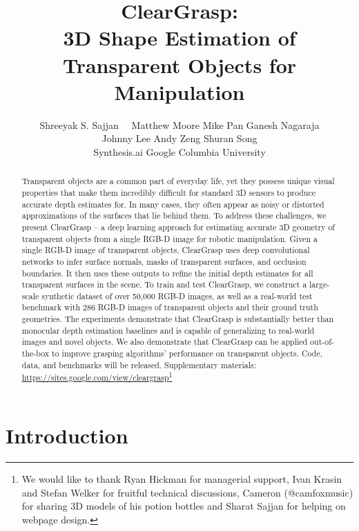\documentclass[letterpaper, 10 pt, conference]{ieeeconf}
\title{\LARGE \bf ClearGrasp: \\3D Shape Estimation of Transparent Objects for Manipulation \vspace{-3mm}}
\author{Shreeyak S. Sajjan  \quad　Matthew Moore  \quad Mike Pan  \quad Ganesh Nagaraja  \\ Johnny Lee \quad  Andy Zeng  \quad  Shuran Song
\vspace{0.1cm} \\ 
 Synthesis.ai \quad\quad
 Google \quad\quad
 Columbia University \quad\quad
}
\begin{document}
\maketitle
\thispagestyle{empty}
\pagestyle{empty}


\begin{abstract}
Transparent objects are a common part of everyday life, yet they possess unique visual properties that make them incredibly difficult for standard 3D sensors to produce accurate depth estimates for. In many cases, they often appear as noisy or distorted approximations of the surfaces that lie behind them. To address these challenges, we present ClearGrasp -- a deep learning approach for estimating accurate 3D geometry of transparent objects from a single RGB-D image for robotic manipulation. Given a single RGB-D image of transparent objects, ClearGrasp uses deep convolutional networks to infer surface normals, masks of transparent surfaces, and occlusion boundaries. It then uses these outputs to refine the initial depth estimates for all transparent surfaces in the scene. To train and test ClearGrasp, we construct a large-scale synthetic dataset of over 50,000 RGB-D images, as well as a real-world test benchmark with 286 RGB-D images of transparent objects and their ground truth geometries. The experiments demonstrate that ClearGrasp is substantially better than monocular depth estimation baselines and is capable of generalizing to real-world images and novel objects. We also demonstrate that ClearGrasp can be applied out-of-the-box to improve grasping algorithms' performance on transparent objects. Code, data, and benchmarks will be released. Supplementary materials: \href{https://sites.google.com/view/cleargrasp}{https://sites.google.com/view/cleargrasp}\footnote{We would like to thank Ryan Hickman for managerial support, Ivan Krasin and Stefan Welker for fruitful technical discussions, Cameron (@camfoxmusic) for sharing 3D models of his potion bottles and Sharat Sajjan for helping on webpage design.
}

\end{abstract}




\section{Introduction}
\end{document}
